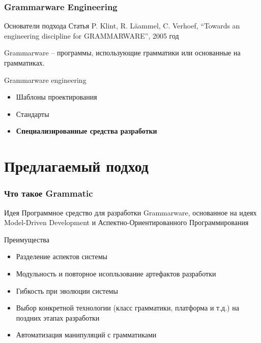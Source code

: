 \documentclass[paper=screen,10pt,unicode]{beamer}
\begin{document}
\begin{frame}
	\frametitle{Grammarware Engineering}

	\begin{block}{Основатели подхода}
		Статья P. Klint, R. L\"{a}ammel, C. Verhoef, ``Towards an engineering discipline for GRAMMARWARE'', 2005 год
	\end{block}
	\begin{block}{}
		\alert{Grammarware} -- программы, использующие грамматики или основанные на грамматиках.
	\end{block}
	\begin{block}{Grammarware engineering}
		\begin{itemize}
			\item Шаблоны проектирования
			\item Стандарты
			\item {\bf Специализированные средства разработки }
		\end{itemize}
	\end{block}
\end{frame}

\section{Предлагаемый подход}
\begin{frame}
	\frametitle{Что такое Grammatic}

	\begin{block}{Идея}
		Программное средство для разработки Grammarware, основанное на идеях Model-Driven Development
		и Аспектно-Ориентированного Программирования
	\end{block}
	\begin{block}{Преимущества}
		\begin{itemize}
			\item Разделение аспектов системы
			\item Модульность и повторное исопльзование артефактов разработки
			\item Гибкость при эволюции системы
			\item Выбор конкретной технологии (класс грамматики, платформа и т.д.) на поздних этапах разработки
			\item Автоматизация манипуляций с грамматиками
		\end{itemize}
	\end{block}
\end{frame}
\end{document}
